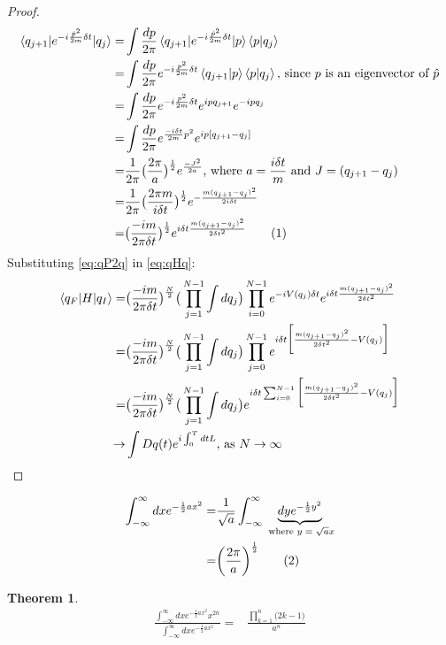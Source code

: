 \documentclass[]{article}
\newcommand\numberthis{\addtocounter{equation}{1}\tag{\theequation}}
\newtheorem{thm}{Theorem}
\begin{document}
\begin{proof}
	\begin{align*}
		\braket{q_{j+1} \vert e^{-i\frac{\hat{p}^2}{2m} \delta t}  \vert q_j}=& \int \frac{dp}{2\pi}\braket{q_{j+1} \vert e^{-i\frac{\hat{p}^2}{2m} \delta t}  \vert p} \braket{p\vert q_j}\\
		=& \int \frac{dp}{2\pi} e^{-i\frac{p^2}{2m} \delta t} \braket{q_{j+1} \vert p} \braket{p\vert q_j} \text{, since $p$ is an eigenvector of $\hat{p}$}\\
		=& \int \frac{dp}{2\pi} e^{-i\frac{p^2}{2m} \delta t} e^{ip q_{j+1}} e^{-ip q_j} \\
		=& \int \frac{dp}{2\pi} e^{\frac{-i \delta t}{2m}p^2} e^{ip [q_{j+1}-q_j]} \\
		=& \frac{1}{2\pi} \big(\frac{2\pi}{a}\big)^\frac{1}{2} e^{\frac{-J^2}{2a}} \text{, where $a=\frac{i \delta t}{m}$ and $J=(q_{j+1}-q_j)$}\\
		=& \frac{1}{2\pi} \big(\frac{2\pi m}{i \delta t}\big)^\frac{1}{2} e^{-\frac{m (q_{j+1}-q_j)^2}{2 i \delta t}}\\
		=& \big(\frac{-i m}{2\pi \delta t}\big)^\frac{1}{2} e^{i \delta t \frac{m (q_{j+1}-q_j)^2}{2  {\delta t}^2}}  \numberthis \label{eq:qP2q}
	\end{align*}
	Substituting \eqref{eq:qP2q} in \eqref{eq:qHq}: 
	\begin{align*}
		\braket{q_F\vert H\vert q_I} =& \big(\frac{-i m}{2\pi \delta t}\big)^\frac{N}{2} \big(\prod_{j=1}^{N-1} \int dq_j\big) \prod_{i=0}^{N-1} e^{-i V(q_j) \delta t} e^{i \delta t \frac{m (q_{j+1}-q_j)^2}{2  {\delta t}^2}}\\
		=& \big(\frac{-i m}{2\pi \delta t}\big)^\frac{N}{2} \big(\prod_{j=1}^{N-1} \int dq_j\big) \prod_{j=0}^{N-1}  e^{i \delta t \bigg[\frac{m (q_{j+1}-q_j)^2}{2  {\delta t}^2} - V(q_j)\bigg]}\\
		=& \big(\frac{-i m}{2\pi \delta t}\big)^\frac{N}{2} \big(\prod_{j=1}^{N-1} \int dq_j\big)  e^{i \delta t \sum_{i=0}^{N-1}\bigg[\frac{m (q_{j+1}-q_j)^2}{2  {\delta t}^2} - V(q_j)\bigg]}\\
		\rightarrow& \int Dq(t) e^{i \int_{0}^{T}dt L} \text{, as $N\rightarrow\infty$}
	\end{align*}
\end{proof}

\begin{align*}
	\int_{-\infty}^{\infty} dx e^{-\frac{1}{2}ax^2} =& \frac{1}{\sqrt{a}}\int_{-\infty}^{\infty} \underbrace{dy e^{-\frac{1}{2}y^2}}_\text{ where $y=\sqrt{a}x$} \\
	=& \bigg(\frac{2\pi}{a}\bigg)^\frac{1}{2} \numberthis \label{eq:integral:gaussian}
\end{align*}
\begin{thm}
	\begin{align*}
		\frac{\int_{-\infty}^\infty dx e^{-\frac{1}{2}ax^2}x^{2n}}{\int_{-\infty}^\infty dx e^{-\frac{1}{2}ax^2}} =&\frac{\prod_{k=1}^{n}\big(2k-1\big)}{a^n}
	\end{align*}
\end{thm}
\end{document}
